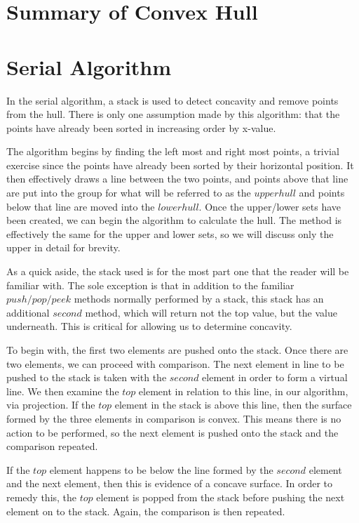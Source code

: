 \documentclass[conference]{IEEEtran}
\begin{document}
\section{Summary of Convex Hull}


\section{Serial Algorithm}
In the serial algorithm, a stack is used to detect concavity and remove points from the hull. There is only one assumption made by this algorithm: that the points have already been sorted in increasing order by x-value. 

The algorithm begins by finding the left most and right most points, a trivial exercise since the points have already been sorted by their horizontal position. It then effectively draws a line between the two points, and points above that line are put into the group for what will be referred to as the $upper hull$ and points below that line are moved into the $lower hull$. Once the upper/lower sets have been created, we can begin the algorithm to calculate the hull. The method is effectively the same for the upper and lower sets, so we will discuss only the upper in detail for brevity.

As a quick aside, the stack used is for the most part one that the reader will be familiar with. The sole exception is that in addition to the familiar $push/pop/peek$ methods normally performed by a stack, this stack has an additional $second$ method, which will return not the top value, but the value underneath. This is critical for allowing us to determine concavity.

To begin with, the first two elements are pushed onto the stack. Once there are two elements, we can proceed with comparison. The next element in line to be pushed to the stack is taken with the $second$ element in order to form a virtual line. We then examine the $top$ element in relation to this line, in our algorithm, via projection. If the $top$ element in the stack is above this line, then the surface formed by the three elements in comparison is convex. This means there is no action to be performed, so the next element is pushed onto the stack and the comparison repeated.

If the $top$ element happens to be below the line formed by the $second$ element and the next element, then this is evidence of a concave surface. In order to remedy this, the $top$ element is popped from the stack before pushing the next element on to the stack. Again, the comparison is then repeated.
\end{document}
